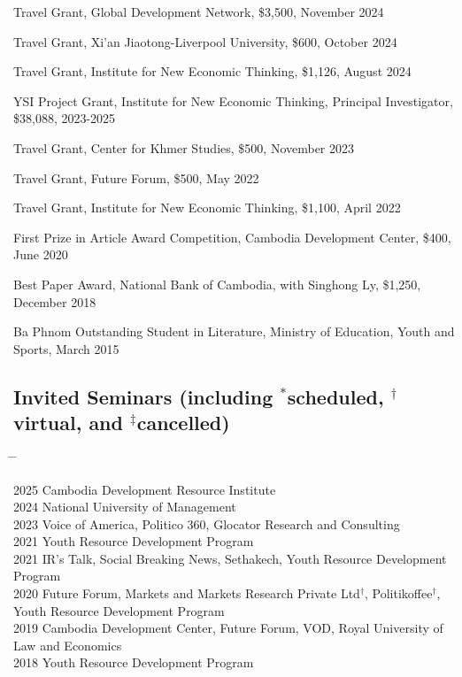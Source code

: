 \documentclass[10pt,a4paper]{article}
\newcommand{\tabbedblock}[1]{

	\begin{tabbing}
		\hspace{2cm} \= \hspace{4cm} \= \kill
		#1
	\end{tabbing}
}
\begin{document}
Travel Grant, Global Development Network, \$3,500, November 2024

Travel Grant, Xi'an Jiaotong-Liverpool University, \$600, October 2024

Travel Grant, Institute for New Economic Thinking, \$1,126, August 2024

YSI Project Grant, Institute for New Economic Thinking, Principal Investigator, \$38,088, 2023-2025

Travel Grant, Center for Khmer Studies, \$500, November 2023

Travel Grant, Future Forum, \$500, May 2022

Travel Grant, Institute for New Economic Thinking, \$1,100, April 2022

First Prize in Article Award Competition, Cambodia Development Center, \$400, June 2020

Best Paper Award, National Bank of Cambodia, with Singhong Ly, \$1,250, December 2018 

Ba Phnom Outstanding Student in Literature, Ministry of Education, Youth and Sports, March 2015


\subsection*{Invited Seminars (including $^\ast$scheduled, $^\dag$virtual, and $^\ddag$cancelled)}

\tabbedblock{
	2025 \> Cambodia Development Resource Institute\\ 
	
	2024 \> National University of Management\\ 
	
	2023 \> Voice of America, Politico 360, Glocator Research and Consulting \\
		
	2021  \>  Youth Resource Development Program \\
	
	
	2021  \>  IR’s Talk, Social Breaking News, Sethakech, Youth Resource Development Program \\
	
	2020 \>  Future Forum, Markets and Markets Research Private Ltd$^\dag$, Politikoffee$^\dag$, \\
	\> Youth Resource Development Program \\
	
	2019 \> Cambodia Development Center, Future Forum, VOD, Royal University of Law and Economics \\
	
	2018 \> Youth Resource Development Program
}
	
\end{document}
